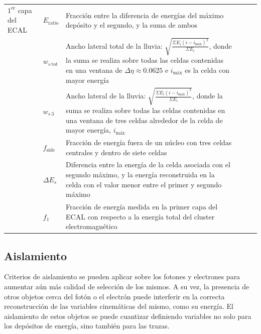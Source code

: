 \begin{table}
\begin{tabular}{ p{2.1cm} l p{8cm} c c c}
		\hline

		$1^{\text{er}}$ capa del ECAL & $E_{\text{ratio}}$ & Fracción entre la diferencia de energías del máximo depósito y el segundo, y la suma de ambos & \xmark & \cmark & \cmark \\

		 & $w_{s\:\text{tot}}$ & Ancho lateral total de la lluvia: $\sqrt{\frac{\Sigma E_{i}(i-i_{\text{máx}})^{2}}{\Sigma E_{i}}}$, donde la suma se realiza sobre todas las celdas contenidas en una ventana de $\Delta\eta\approx0.0625$ e $i_{\text{máx}}$ es la celda con mayor energía & \xmark & \xmark & \cmark \\

		 & $w_{s\:\text{3}}$ & Ancho lateral de la lluvia: $\sqrt{\frac{\Sigma E_{i}(i-i_{\text{máx}})^{2}}{\Sigma E_{i}}}$, donde la suma se realiza sobre todas las celdas contenidas en una ventana de tres celdas alrededor de la celda de mayor energía, $i_{\text{máx}}$ & \xmark & \xmark & \cmark \\

		 & $f_{\text{side}}$ & Fracción de energía fuera de un núcleo con tres celdas centrales y dentro de siete celdas & \xmark & \xmark & \cmark \\

		 & $\Delta E_{s}$ & Diferencia entre la energía de la celda asociada con el segundo máximo, y la energía reconstruida en la celda con el valor menor entre el primer y segundo máximo & \xmark & \xmark & \cmark \\

		 & $f_{\text{1}}$ & Fracción de energía medida en la primer capa del ECAL con respecto a la energía total del cluster electromagnético & \xmark & \xmark & \cmark \\

     \hline
     \hline

	\end{tabular}

\label{tab:phIDVars}
\end{table}




\subsection{Aislamiento}

Criterios de aislamiento se pueden aplicar sobre los fotones y electrones para aumentar aún más calidad de selección de los mismos. A su vez, la presencia de otros objetos cerca del fotón o el electrón puede interferir en la correcta reconstrucción de las variables cinemáticas del mismo, como su energía. El aislamiento de estos objetos se puede cuantizar definiendo variables no solo para los depósitos de energía, sino también para las trazas.

